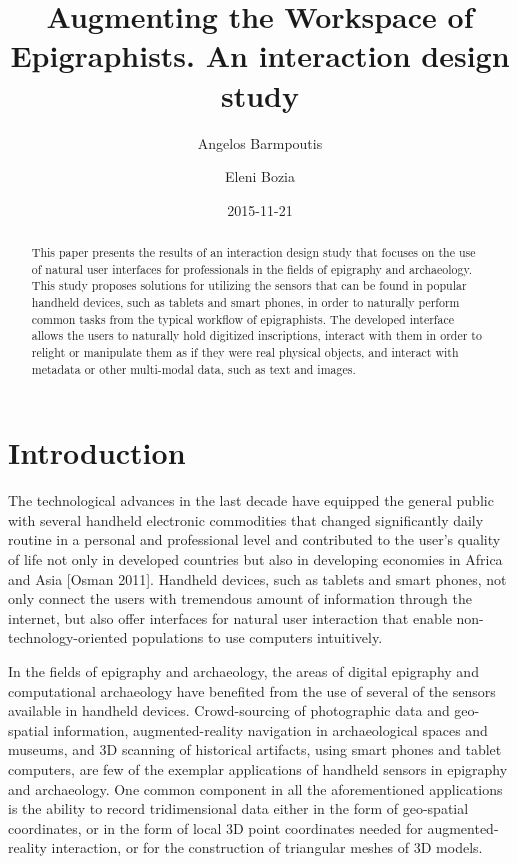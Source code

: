 \documentclass[amsthm,ebook]{saparticle}
\title{Augmenting the Workspace of Epigraphists.
An interaction design study}
\author[1]{Angelos Barmpoutis\corref{first}}
\author[2]{Eleni Bozia}
\date{2015-11-21}
\begin{document}
\maketitle
\begin{abstract}
This paper presents the results of an interaction design study that focuses on the use of natural user
interfaces for professionals in the fields of epigraphy and archaeology. This study proposes solutions for utilizing
the sensors that can be found in popular handheld devices, such as tablets and smart phones, in order to naturally
perform common tasks from the typical workflow of epigraphists. The developed interface allows the users to naturally
hold digitized inscriptions, interact with them in order to relight or manipulate them as if they were real physical
objects, and interact with metadata or other multi-modal data, such as text and images. 
\end{abstract}

\section{Introduction}


\noindent The technological advances in the last decade have equipped the general public with several handheld electronic
commodities that changed significantly daily routine in a personal and professional level and contributed to the user's
quality of life not only in developed countries but also in developing economies in Africa and Asia [Osman 2011].
Handheld devices, such as tablets and smart phones, not only connect the users with tremendous amount of information
through the internet, but also offer interfaces for natural user interaction that enable non-technology-oriented
populations to use computers intuitively.

In the fields of epigraphy and archaeology, the areas of digital epigraphy and computational archaeology have benefited
from the use of several of the sensors available in handheld devices. Crowd-sourcing of photographic data and
geo-spatial information, augmented-reality navigation in archaeological spaces and museums, and 3D scanning of
historical artifacts, using smart phones and tablet computers, are few of the exemplar applications of handheld
sensors in epigraphy and archaeology. One common component in all the aforementioned applications is the ability to
record tridimensional data either in the form of geo-spatial coordinates, or in the form of local 3D point coordinates
needed for augmented-reality interaction, or for the construction of triangular meshes of 3D models. 
\end{document}
